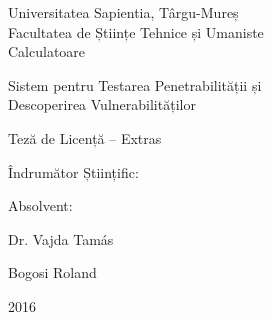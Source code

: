
\renewcommand{\listoflistingscaption}{Lista fragmente de coduri}
\renewcommand{\listingscaption}{Fragment de cod}

\newpage
\pagestyle{empty}

	\begin{center}
		{\Large Universitatea Sapientia, Târgu-Mureș}\\\vspace{0.05in}
		{\Large Facultatea de Științe Tehnice și Umaniste}\\\vspace{0.07in}
		{\Large Calculatoare}\\
		
		\vspace{2.35in}
		
		{\huge Sistem pentru Testarea Penetrabilității și}\\\vspace{0.15in}
		{\huge Descoperirea Vulnerabilităților}
		
		\vspace{0.5in}
		
		{\LARGE Teză de Licență -- Extras}
		
	\end{center}
	
	\vspace{2.0in}
	
	\begin{multicols}{2}
		\begin{flushleft}
			{\Large Îndrumător Științific:}
		\end{flushleft}
		\columnbreak
		\begin{flushright}
			{\Large Absolvent:}
		\end{flushright}
	\end{multicols}
	\begin{multicols}{2}
		\begin{flushleft}
			{\LARGE Dr. Vajda Tamás}
		\end{flushleft}
		\columnbreak
		\begin{flushright}
			{\LARGE Bogosi Roland}
		\end{flushright}
	\end{multicols}
	
	\vspace{1.5in}
		
	\begin{center}
		{\LARGE 2016}
	\end{center}

